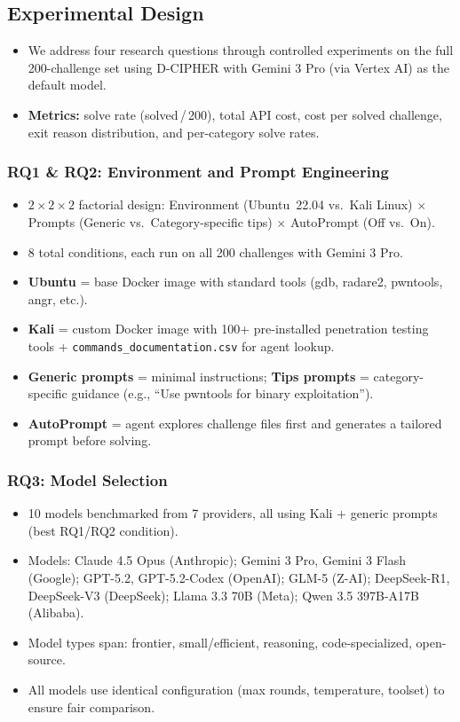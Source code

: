 \documentclass[conference]{IEEEtran}
\begin{document}
\subsection{Experimental Design}

\begin{itemize}
  \item We address four research questions through controlled experiments on the full 200-challenge set using D-CIPHER with Gemini 3 Pro (via Vertex AI) as the default model.
  \item \textbf{Metrics:} solve rate (solved\,/\,200), total API cost, cost per solved challenge, exit reason distribution, and per-category solve rates.
\end{itemize}

\subsubsection{RQ1 \& RQ2: Environment and Prompt Engineering}

\begin{itemize}
  \item $2\!\times\!2\!\times\!2$ factorial design: Environment (Ubuntu~22.04 vs.\ Kali Linux) $\times$ Prompts (Generic vs.\ Category-specific tips) $\times$ AutoPrompt (Off vs.\ On).
  \item 8 total conditions, each run on all 200 challenges with Gemini 3 Pro.
  \item \textbf{Ubuntu} = base Docker image with standard tools (gdb, radare2, pwntools, angr, etc.).
  \item \textbf{Kali} = custom Docker image with 100+ pre-installed penetration testing tools + \texttt{commands\_documentation.csv} for agent lookup.
  \item \textbf{Generic prompts} = minimal instructions; \textbf{Tips prompts} = category-specific guidance (e.g., ``Use pwntools for binary exploitation'').
  \item \textbf{AutoPrompt} = agent explores challenge files first and generates a tailored prompt before solving.
\end{itemize}

\subsubsection{RQ3: Model Selection}

\begin{itemize}
  \item 10 models benchmarked from 7 providers, all using Kali + generic prompts (best RQ1/RQ2 condition).
  \item Models: Claude 4.5 Opus (Anthropic); Gemini 3 Pro, Gemini 3 Flash (Google); GPT-5.2, GPT-5.2-Codex (OpenAI); GLM-5 (Z-AI); DeepSeek-R1, DeepSeek-V3 (DeepSeek); Llama 3.3 70B (Meta); Qwen 3.5 397B-A17B (Alibaba).
  \item Model types span: frontier, small/efficient, reasoning, code-specialized, open-source.
  \item All models use identical configuration (max rounds, temperature, toolset) to ensure fair comparison.
\end{itemize}
\end{document}
